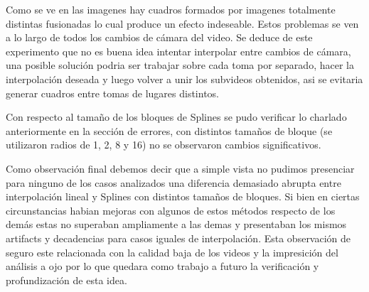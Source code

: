 Como se ve en las imagenes hay cuadros formados por imagenes totalmente distintas fusionadas lo cual produce un efecto indeseable. Estos problemas se ven a lo largo de todos los cambios de cámara del video. Se deduce de este experimento que no es buena idea intentar interpolar entre cambios de cámara, una posible solución podria ser trabajar sobre cada toma por separado, hacer la interpolación deseada y luego volver a unir los subvideos obtenidos, asi se evitaria generar cuadros entre tomas de lugares distintos.

Con respecto al tamaño de los bloques de Splines se pudo verificar lo charlado anteriormente en la sección de errores, con distintos tamaños de bloque (se utilizaron radios de 1, 2, 8 y 16) no se observaron cambios significativos.

Como observación final debemos decir que a simple vista no pudimos presenciar para ninguno de los casos analizados una diferencia demasiado abrupta entre interpolación lineal y Splines con distintos tamaños de bloques. Si bien en ciertas circunstancias habian mejoras con algunos de estos métodos respecto de los demás estas no superaban ampliamente a las demas y presentaban los mismos artifacts y decadencias para casos iguales de interpolación. Esta observación de seguro este relacionada con la calidad baja de los videos y la impresición del análisis a ojo por lo que quedara como trabajo a futuro la verificación y profundización de esta idea.
